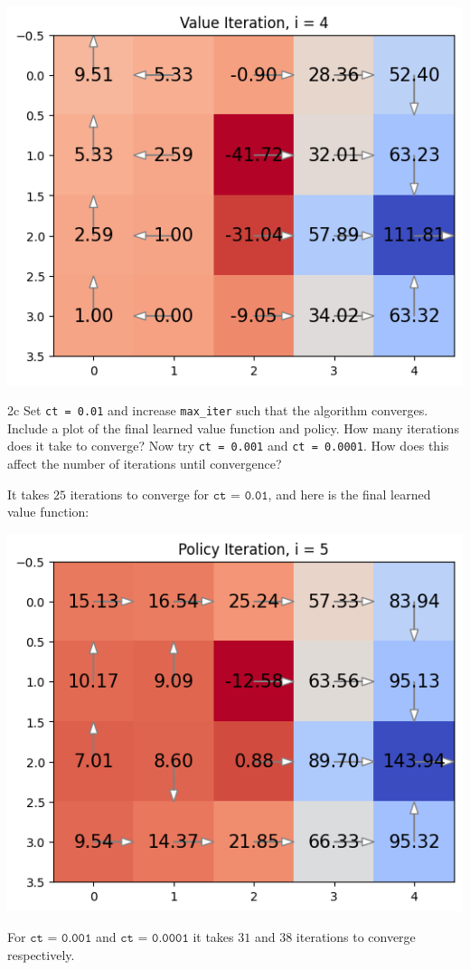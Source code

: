 \documentclass[expanded]{lkx_pset}
\begin{document}
\begin{solution}
\begin{center}
		\includegraphics[scale=0.5]{figures/2b-4.png}
	\end{center}

	\begin{part}{2c} Set \texttt{ct = 0.01} and increase \texttt{max\_iter} such that the algorithm converges. Include a plot of the final learned value function and policy. How many iterations does it take to converge? Now try \texttt{ct = 0.001} and \texttt{ct = 0.0001}. How does this affect the number of iterations until convergence?
	\end{part}

	It takes $25$ iterations to converge for $\texttt{ct = 0.01}$, and here is the final learned value function:
	\begin{center}
		\includegraphics[scale=0.5]{figures/1d.png}
	\end{center}
	For $\texttt{ct = 0.001}$ and $\texttt{ct = 0.0001}$ it takes $31$ and $38$ iterations to converge respectively.


\end{solution}
\end{document}
